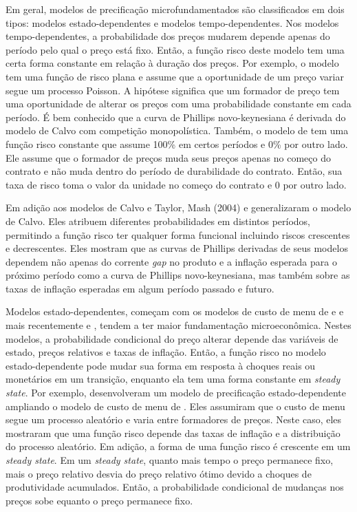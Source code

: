 \documentclass[twoside,a4paper,11pt]{report}
\begin{document}
Em geral, modelos de precificação microfundamentados são classificados em dois tipos: modelos estado-dependentes e modelos tempo-dependentes. Nos modelos tempo-dependentes, a probabilidade dos preços mudarem depende apenas do período pelo qual o preço está fixo. Então, a função risco deste modelo tem uma certa forma constante em relação à duração dos preços. Por exemplo, o modelo \citet{calvo1983staggered} tem uma função de risco plana e assume que a oportunidade de um preço variar segue um processo Poisson. A hipótese significa que um formador de preço tem uma oportunidade de alterar os preços com uma probabilidade constante em cada período. É bem conhecido que a curva de Phillips novo-keynesiana é derivada do modelo de Calvo com competição monopolística. Também, o modelo de \citet{taylor1980aggregate} tem uma função risco constante que assume 100\% em certos períodos e 0\% por outro lado. Ele assume que o formador de preços muda seus preços apenas no começo do contrato e não muda dentro do período de durabilidade do contrato. Então, sua taxa de risco toma o valor da unidade no começo do contrato e $0$ por outro lado. 

Em adição aos modelos de Calvo e Taylor, Mash (2004) e \citet{coenen2007identifying} generalizaram o modelo de Calvo. Eles atribuem diferentes probabilidades em distintos períodos, permitindo a função risco ter qualquer forma funcional incluindo riscos crescentes e decrescentes. Eles mostram que as curvas de Phillips derivadas de seus modelos dependem não apenas do corrente \emph{gap} no produto e a inflação esperada para o próximo período como a curva de Phillips novo-keynesiana, mas também sobre as taxas de inflação esperadas em algum período passado e futuro. 

Modelos estado-dependentes, começam com os modelos de custo de menu de \citet{barro1972theory} e \citet{sheshinski1977inflation} e mais recentemente \citet{dotsey1999state} e \citet{golosov2007menu}, tendem a ter maior fundamentação microeconômica. Nestes modelos, a probabilidade condicional do preço alterar depende das variáveis de estado, preços relativos e taxas de inflação. Então, a função risco no modelo estado-dependente pode mudar sua forma em resposta à choques reais ou monetários em um transição, enquanto ela tem uma forma constante em \emph{steady state}. Por exemplo, \citet{dotsey1999state} desenvolveram um modelo de precificação estado-dependente ampliando o modelo de custo de menu de \citet{blanchard1987monopolistic}. Eles assumiram que o custo de menu segue um processo aleatório e varia entre formadores de preços. Neste caso, eles mostraram que uma função risco depende das taxas de inflação e a distribuição do processo aleatório. Em adição, a forma de uma função risco é crescente em um \emph{steady state}. Em um \emph{steady state}, quanto mais tempo o preço permanece fixo, mais o preço relativo desvia do preço relativo ótimo devido a choques de produtividade acumulados. Então, a probabilidade condicional de mudanças nos preços sobe equanto o preço permanece fixo. 
\end{document}
